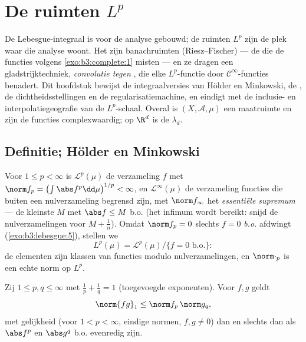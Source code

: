 \chapter{De ruimten \texorpdfstring{$L^p$}{Lp}}\label{ch:b3:lp}

De Lebesgue-integraal is voor de analyse gebouwd; de ruimten $L^p$
zijn de plek waar die analyse woont. Het zijn banachruimten
(Riesz--Fischer) --- de  die de  functies
volgens \cref{exo:b3:complete:1} misten --- en ze dragen een
gladstrijktechniek, \emph{convolutie tegen }, die elke
$L^p$-functie door $\mathcal C^\infty$-functies benadert. Dit
hoofdstuk bewijst de integraalversies van Hölder en Minkowski, de
, de dichtheidsstellingen en de regularisatiemachine,
en eindigt met de inclusie- en interpolatiegeografie van de
$L^p$-schaal. Overal is $(X, \mathcal A, \mu)$ een maatruimte en
zijn de functies complexwaardig; op $\R^d$ is de  $\lambda_d$.

\section{Definitie; Hölder en Minkowski}

\begin{definition}\label{def:b3:lp:space}
Voor $1 \leq p < \infty$ is $\mathcal L^p(\mu)$ de verzameling
 $f$ met $\norm f_p = \bigl(\int\abs
f^p\dd\mu\bigr)^{1/p} < \infty$, en $\mathcal L^\infty(\mu)$ de
verzameling functies die buiten een nulverzameling begrensd zijn,
met $\norm f_\infty$ het \emph{essentiële supremum} --- de
kleinste $M$ met $\abs f \leq M$ b.o. (het infimum wordt bereikt:
snijd de nulverzamelingen voor $M + \frac1n$). Omdat $\norm f_p =
0$ slechts $f = 0$ \emph{b.o.} afdwingt
(\cref{exo:b3:lebesgue:5}), stellen we
\[
L^p(\mu) = \mathcal L^p(\mu)/\{f = 0 \text{ b.o.}\} :
\]
de elementen zijn klassen van functies modulo nulverzamelingen,
en $\norm\cdot_p$ is een echte norm op
$L^p$.
\end{definition}

\begin{theorem}\label{thm:b3:lp:holder}
Zij $1 \leq p, q \leq \infty$ met $\frac1p + \frac1q = 1$
(toegevoegde exponenten). Voor  $f, g$
geldt
\[
\norm{fg}_1 \leq \norm f_p\,\norm g_q ,
\]
met gelijkheid (voor $1 < p < \infty$, eindige normen, $f,g\ne0$)
dan en slechts dan als $\abs f^p$ en $\abs g^q$ b.o. evenredig
zijn.
\end{theorem}

